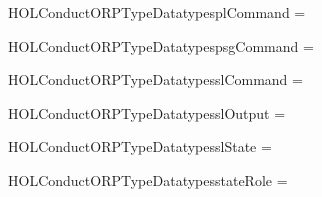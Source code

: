 \newcommand{\HOLConductORPTypeDate}{16 May 2018}
\newcommand{\HOLConductORPTypeTime}{16:33}
\begin{SaveVerbatim}{HOLConductORPTypeDatatypesplCommand}
 =  \HOLTokenBar{}  \HOLTokenBar{}  \HOLTokenBar{} 
\end{SaveVerbatim}
\newcommand{\HOLConductORPTypeDatatypesplCommand}{\UseVerbatim{HOLConductORPTypeDatatypesplCommand}}
\begin{SaveVerbatim}{HOLConductORPTypeDatatypespsgCommand}
 =  \HOLTokenBar{} 
\end{SaveVerbatim}
\newcommand{\HOLConductORPTypeDatatypespsgCommand}{\UseVerbatim{HOLConductORPTypeDatatypespsgCommand}}
\begin{SaveVerbatim}{HOLConductORPTypeDatatypesslCommand}
 =   \HOLTokenBar{}  
\end{SaveVerbatim}
\newcommand{\HOLConductORPTypeDatatypesslCommand}{\UseVerbatim{HOLConductORPTypeDatatypesslCommand}}
\begin{SaveVerbatim}{HOLConductORPTypeDatatypesslOutput}
 =  \HOLTokenBar{}  \HOLTokenBar{}  \HOLTokenBar{}  \HOLTokenBar{} 
         \HOLTokenBar{}  \HOLTokenBar{} 
\end{SaveVerbatim}
\newcommand{\HOLConductORPTypeDatatypesslOutput}{\UseVerbatim{HOLConductORPTypeDatatypesslOutput}}
\begin{SaveVerbatim}{HOLConductORPTypeDatatypesslState}
 =  \HOLTokenBar{}  \HOLTokenBar{}  \HOLTokenBar{} 
        \HOLTokenBar{} 
\end{SaveVerbatim}
\newcommand{\HOLConductORPTypeDatatypesslState}{\UseVerbatim{HOLConductORPTypeDatatypesslState}}
\begin{SaveVerbatim}{HOLConductORPTypeDatatypesstateRole}
 =  \HOLTokenBar{} 
\end{SaveVerbatim}
\newcommand{\HOLConductORPTypeDatatypesstateRole}{\UseVerbatim{HOLConductORPTypeDatatypesstateRole}}
\newcommand{\HOLConductORPTypeDatatypes}{
\HOLConductORPTypeDatatypesplCommand\HOLConductORPTypeDatatypespsgCommand\HOLConductORPTypeDatatypesslCommand\HOLConductORPTypeDatatypesslOutput\HOLConductORPTypeDatatypesslState\HOLConductORPTypeDatatypesstateRole}
